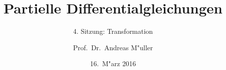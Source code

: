 \documentclass[handout]{beamer}
\title[]{Partielle Differentialgleichungen}
\subtitle{4. Sitzung: Transformation}
\date[16.~M"arz 2016]{16.~M"arz 2016}
\author{Prof.~Dr.~Andreas M"uller}
\begin{document}
\begin{frame}
\titlepage

\end{frame}


\end{document}
